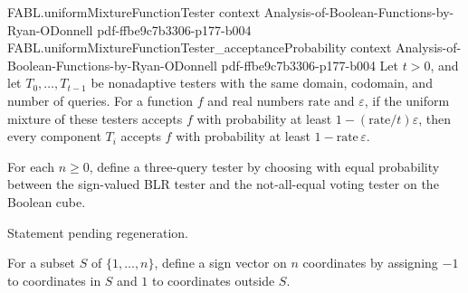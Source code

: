\begin{theorem}
\proofstep
  {FABL.uniformMixtureFunctionTester}
  {context}
  {Analysis-of-Boolean-Functions-by-Ryan-ODonnell}
  {pdf-ffbe9c7b3306-p177-b004}
\proofstep
  {FABL.uniformMixtureFunctionTester_acceptanceProbability}
  {context}
  {Analysis-of-Boolean-Functions-by-Ryan-ODonnell}
  {pdf-ffbe9c7b3306-p177-b004}
Let $t>0$, and let $T_0,\ldots,T_{t-1}$ be nonadaptive testers with the same domain,
codomain, and number of queries. For a function $f$ and real numbers $\mathrm{rate}$ and
$\varepsilon$, if the uniform mixture of these testers accepts $f$ with probability at
least $1-(\mathrm{rate}/t)\varepsilon$, then every component $T_i$ accepts $f$ with
probability at least $1-\mathrm{rate}\,\varepsilon$.
\end{theorem}

\begin{definition}
\label{FABL.blrNaeFunctionTester}
\leanok
{}
For each $n\ge 0$, define a three-query tester by choosing with equal probability
between the sign-valued BLR tester and the not-all-equal voting tester on the Boolean
cube.
\end{definition}

\begin{theorem}
\label{FABL.blrNae_isLocalTester}
\leanok
{}
Statement pending regeneration.
\end{theorem}

\begin{definition}
\label{FABL.subsetIndicatorSign}
\leanok
{}
For a subset $S$ of $\{1,\ldots,n\}$, define a sign vector on $n$ coordinates by
assigning $-1$ to coordinates in $S$ and $1$ to coordinates outside $S$.
\end{definition}

